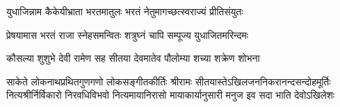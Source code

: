 \twolineshloka
{युधाजिन्नाम कैकेयीभ्राता भरतमातुलः}
{भरतं नेतुमागच्छत्स्वराज्यं प्रीतिसंयुतः} %

\twolineshloka
{प्रेषयामास भरतं राजा स्नेहसमन्वितः}
{शत्रुघ्नं चापि सम्पूज्य युधाजितमरिन्दमः} %

\twolineshloka
{कौसल्या शुशुभे देवी रामेण सह सीतया}
{देवमातेव पौलोम्या शच्या शक्रेण शोभना} %

\fourlineindentedshloka
{साकेते लोकनाथप्रथितगुणगणो लोकसङ्गीतकीर्तिः}
{श्रीरामः सीतयास्तेऽखिलजननिकरानन्दसन्दोहमूर्तिः}
{नित्यश्रीर्निर्विकारो निरवधिविभवो नित्यमायानिरासो}
{मायाकार्यानुसारी मनुज इव सदा भाति देवोऽखिलेशः} %


